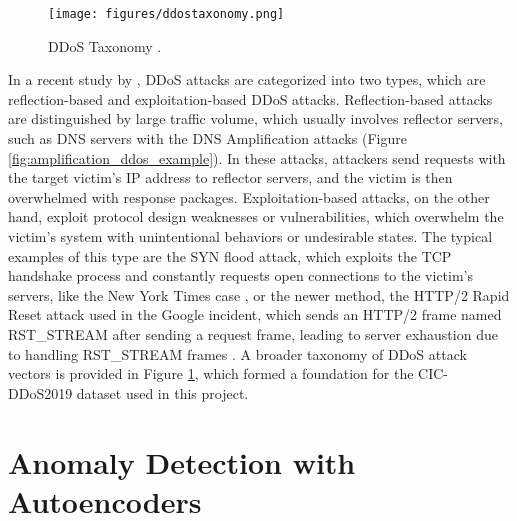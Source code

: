 \begin{figure}[h]
    \centering
    \texttt{[image: figures/ddostaxonomy.png]}
    \caption{DDoS Taxonomy \citep{8888419}.}
    \label{fig:ddos_taxonomies}
\end{figure}

In a recent study by \cite{8888419}, DDoS attacks are categorized into two types, which are reflection-based and exploitation-based DDoS attacks. Reflection-based attacks are distinguished by large traffic volume, which usually involves reflector servers, such as DNS servers with the DNS Amplification attacks (Figure \ref{fig:amplification_ddos_example}). In these attacks, attackers send requests with the target victim's IP address to reflector servers, and the victim is then overwhelmed with response packages. Exploitation-based attacks, on the other hand, exploit protocol design weaknesses or vulnerabilities, which overwhelm the victim's system with unintentional behaviors or undesirable states. The typical examples of this type are the SYN flood attack, which exploits the TCP handshake process and constantly requests open connections to the victim's servers, like the New York Times case \citep{nyt-ddos}, or the newer method, the HTTP/2 Rapid Reset attack used in the Google incident, which sends an HTTP/2 frame named RST\_STREAM after sending a request frame, leading to server exhaustion due to handling RST\_STREAM frames \citep{google-http2-rapid-reset}. A broader taxonomy of DDoS attack vectors is provided in Figure \ref{fig:ddos_taxonomies}, which formed a foundation for the CIC-DDoS2019 dataset used in this project.

\section{Anomaly Detection with Autoencoders}

